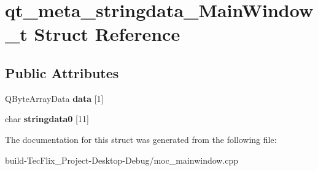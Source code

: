 \hypertarget{structqt__meta__stringdata__MainWindow__t}{}\section{qt\+\_\+meta\+\_\+stringdata\+\_\+\+Main\+Window\+\_\+t Struct Reference}
\label{structqt__meta__stringdata__MainWindow__t}
\subsection*{Public Attributes}
\begin{DoxyCompactItemize}
\item 
\mbox{\label{structqt__meta__stringdata__MainWindow__t_a0ae2a8bf39f0690707c6a48ca1585d31}} 
Q\+Byte\+Array\+Data {\bfseries data} \mbox{[}1\mbox{]}
\item 
\mbox{\label{structqt__meta__stringdata__MainWindow__t_a9779ce86858769bbae7d2cb0c461d77c}} 
char {\bfseries stringdata0} \mbox{[}11\mbox{]}
\end{DoxyCompactItemize}


The documentation for this struct was generated from the following file\+:\begin{DoxyCompactItemize}
\item 
build-\/\+Tec\+Flix\+\_\+\+Project-\/\+Desktop-\/\+Debug/moc\+\_\+mainwindow.\+cpp\end{DoxyCompactItemize}
